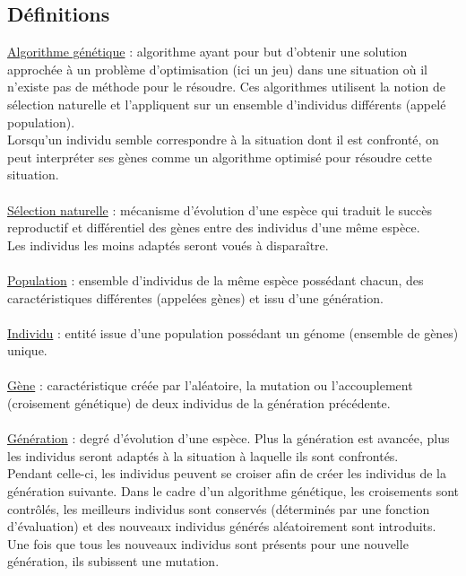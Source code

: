 \documentclass[12pt]{report}
\begin{document}
	\subsection{Définitions}
	\singlespacing
	\underline{Algorithme génétique} : algorithme ayant pour but d'obtenir une solution approchée
	à un problème d'optimisation (ici un jeu) dans une situation où il n'existe pas de méthode
	pour le résoudre. Ces algorithmes utilisent la notion de sélection naturelle et l'appliquent sur un ensemble d'individus différents (appelé population).\\Lorsqu'un individu semble correspondre à la situation dont il est confronté, on peut interpréter ses gènes comme un algorithme optimisé pour résoudre cette situation.\\\\
	\underline{Sélection naturelle} : mécanisme d'évolution d'une espèce qui traduit le succès
	\\reproductif et différentiel des gènes entre des individus d'une même espèce.\\Les individus les moins adaptés seront voués à disparaître.\\\\
	\underline {Population} : ensemble d'individus de la même espèce possédant chacun, des
	\\caractéristiques différentes (appelées gènes) et issu d'une génération.\\\\
	\underline{Individu} : entité issue d'une population possédant un génome (ensemble de gènes) unique.\\\\
	\underline{Gène} : caractéristique créée par l'aléatoire, la mutation ou l'accouplement (croisement génétique) de deux individus de la génération précédente.\\\\
	\underline{Génération} : degré d'évolution d'une espèce. Plus la génération est avancée, plus les individus seront adaptés à la situation à laquelle ils sont confrontés.
	\\Pendant celle-ci, les individus peuvent se croiser afin de créer les individus de la génération suivante. Dans le cadre d'un algorithme génétique, les croisements sont contrôlés, les meilleurs individus sont conservés (déterminés par une fonction d'évaluation) et des nouveaux individus générés aléatoirement sont introduits.\\Une fois que tous les nouveaux individus sont présents pour une nouvelle génération, ils subissent une mutation.\\\\
\end{document}
